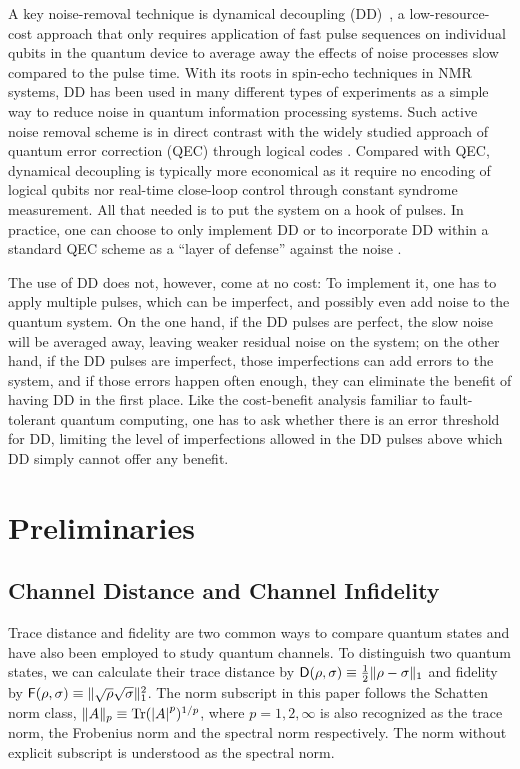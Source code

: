 \documentclass[aps,pra,reprint,superscriptaddress]{revtex4-2}
\begin{document}
A key noise-removal technique is dynamical decoupling (DD)~\cite{viola1999dynamical,duan1998pulse,zanardi1999symmetrizing,khodjasteh2005fault,khodjasteh2007performance,viola2006randomized,uhrig2007keeping,pasini2010optimized,wang2011protection,ng2011combining,kuo2011quadratic}, a low-resource-cost approach that only requires application of fast pulse sequences on individual qubits in the quantum device to average away the eﬀects of noise processes slow compared to the pulse time. With its roots in spin-echo techniques in NMR systems, DD has been used in many diﬀerent types of experiments as a simple way to reduce noise in quantum information processing systems. Such active noise removal scheme is in direct contrast with the widely studied approach of quantum error correction (QEC) through logical codes \cite{laflamme1996perfect,gottesman1997stabilizer,knill1997theory,knill2000theory,shor1996fault,gottesman1998theory,aharonov2008fault}.
Compared with QEC,  dynamical decoupling is typically more economical as it
require no encoding of logical qubits nor real-time close-loop control through constant syndrome measurement. All that needed is to put the system on a hook of pulses. In practice, one can choose to only implement DD or to  
incorporate DD within a standard QEC scheme as a ``layer of defense'' against the noise \cite{west2010high}. 

The use of DD does not, however, come at no cost: To implement it, one has to apply multiple pulses, which can be imperfect, and possibly even add noise to the quantum system. On the one hand, if the DD pulses are perfect, the slow noise will be averaged away, leaving weaker residual noise on the system; on the other hand, if the DD pulses are imperfect, those imperfections can add errors to the system, and if those errors happen often enough, they can eliminate the beneﬁt of having DD in the ﬁrst place. Like the cost-beneﬁt analysis familiar to fault-tolerant quantum computing, one has to ask whether there is an error threshold for DD, limiting the level of imperfections allowed in the DD pulses above which DD simply cannot oﬀer any beneﬁt. 

\section{Preliminaries}

\subsection{Channel Distance and Channel Infidelity}
Trace distance and fidelity are two common ways to compare quantum states and have also been employed to study quantum channels.
To distinguish two quantum states, we can calculate their 
trace distance by $\operatorname{\mathsf{D}}(\rho,\sigma)\equiv \frac{1}{2}\Vert {\rho-\sigma} \Vert_1$ and fidelity by $\operatorname{\mathsf{F}}(\rho,\sigma) \equiv \Vert {\sqrt{\rho}\sqrt{\sigma}} \Vert_1^2$.
The norm subscript in this paper follows the Schatten norm class, $\Vert {A} \Vert_p \equiv \operatorname{Tr}({\left\vert A\right\vert}^p)^{1/p}$, where $p=1,2,\infty$ is also recognized as the trace norm, the Frobenius norm and the spectral norm respectively. The norm without explicit subscript is understood as the spectral norm.
\end{document}

